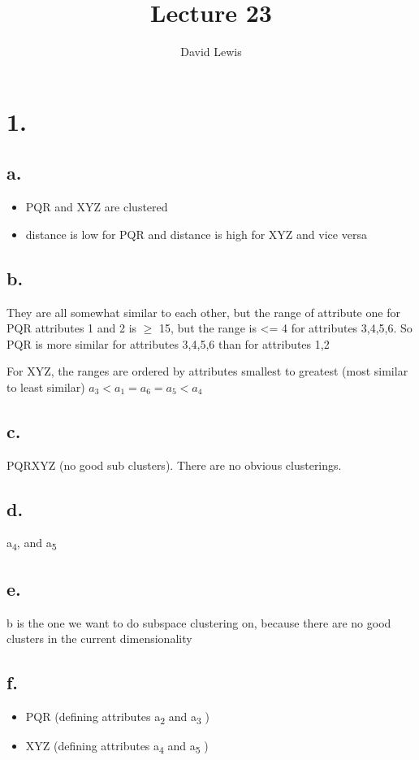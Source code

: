 \documentclass[11pt]{article}
\author{David Lewis}
\date{}
\title{Lecture 23}
\begin{document}
\maketitle
\section*{1.}
\label{sec:org31daf57}
\subsection*{a.}
\label{sec:org87e7ef5}
\begin{itemize}
\item PQR and XYZ are clustered
\item distance is low for PQR and distance is high for XYZ and vice versa
\end{itemize}
\subsection*{b.}
\label{sec:org4386e7a}
They are all somewhat similar to each other, but the range of attribute one for PQR
attributes 1 and 2 is \(\ge\) 15, but the range is <= 4 for attributes 3,4,5,6. So PQR
is more similar for attributes 3,4,5,6 than for attributes 1,2

For XYZ, the ranges are ordered by attributes smallest to greatest (most similar
to least similar) \(a_3 < a_1 = a_6 = a_5 < a_4\)

\subsection*{c.}
\label{sec:org9084c28}
PQRXYZ (no good sub clusters). There are no obvious clusterings.
\subsection*{d.}
\label{sec:orgd7d51d8}
a\textsubscript{4}, and a\textsubscript{5}
\subsection*{e.}
\label{sec:orge78519c}
b is the one we want to do subspace clustering on, because there are no good
clusters in the current dimensionality
\subsection*{f.}
\label{sec:org2a30b65}
\begin{itemize}
\item PQR (defining attributes a\textsubscript{2} and a\textsubscript{3} )
\item XYZ (defining attributes a\textsubscript{4} and a\textsubscript{5} )
\end{itemize}
\end{document}
